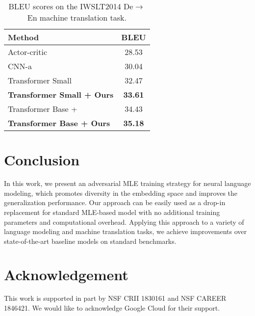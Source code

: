 \documentclass{article}
\begin{document}
\begin{table}[ht]
  	\begin{center}
  	\setlength\extrarowheight{1.5pt}
	\begin{tabular}{lc}
\toprule 
\bf  Method & \bf  BLEU \\
\hline
Actor-critic~\cite{bahdanau2016actor}  &  28.53 \\
CNN-a~\cite{gehring2016convolutional}  &  30.04\\
\hline
Transformer Small~\cite{vaswani2017attention} &  32.47 \\
\bf{Transformer Small + Ours} &  \bf 33.61 \\
\hline
Transformer Base + \cite{wang2018multiagent} &  34.43 \\
\bf{Transformer Base + Ours} &  \bf 35.18 \\
\bottomrule
\end{tabular}
\end{center}
\caption{\label{IWSLT-table} BLEU scores on the IWSLT2014 De$\to$En machine translation task. }
\end{table}


 
\section{Conclusion}
In this work, we present an adversarial MLE training strategy for  neural language modeling,  which promotes diversity in the embedding space and improves the generalization performance.
Our approach can be easily used as a drop-in  replacement for standard MLE-based model
with no additional training parameters and  computational overhead. 
Applying this approach to a variety of language modeling and machine translation tasks, we achieve improvements over state-of-the-art baseline models on standard benchmarks. 

\section*{Acknowledgement}
This work is supported in part by NSF CRII 1830161 and NSF  CAREER 1846421.
We would like to acknowledge Google Cloud for their support.




\end{document}
